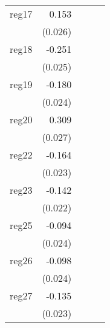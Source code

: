 {\begin{longtable}{l*{4}{D{.}{.}{-1}}}
\addlinespace
reg17       &       0.153\sym{***}&                     &                     &                     \\
            &     (0.026)         &                     &                     &                     \\
\addlinespace
reg18       &      -0.251\sym{***}&                     &                     &                     \\
            &     (0.025)         &                     &                     &                     \\
\addlinespace
reg19       &      -0.180\sym{***}&                     &                     &                     \\
            &     (0.024)         &                     &                     &                     \\
\addlinespace
reg20       &       0.309\sym{***}&                     &                     &                     \\
            &     (0.027)         &                     &                     &                     \\
\addlinespace
reg22       &      -0.164\sym{***}&                     &                     &                     \\
            &     (0.023)         &                     &                     &                     \\
\addlinespace
reg23       &      -0.142\sym{***}&                     &                     &                     \\
            &     (0.022)         &                     &                     &                     \\
\addlinespace
reg25       &      -0.094\sym{***}&                     &                     &                     \\
            &     (0.024)         &                     &                     &                     \\
\addlinespace
reg26       &      -0.098\sym{***}&                     &                     &                     \\
            &     (0.024)         &                     &                     &                     \\
\addlinespace
reg27       &      -0.135\sym{***}&                     &                     &                     \\
            &     (0.023)         &                     &                     &                     \\

\end{longtable}}
